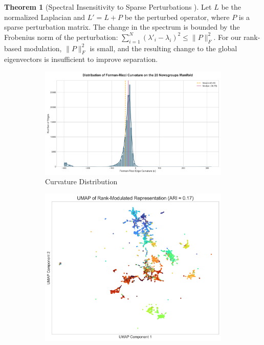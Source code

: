 \documentclass[11pt, letterpaper, twoside]{article}
\theoremstyle{definition}
\newtheorem{theorem}{Theorem}
\begin{document}
\begin{theorem}[Spectral Insensitivity to Sparse Perturbations \cite{hoffman1953variation}]
\label{thm:hoffman}
Let $L$ be the normalized Laplacian and $L' = L+P$ be the perturbed operator, where $P$ is a sparse perturbation matrix. The change in the spectrum is bounded by the Frobenius norm of the perturbation: $\sum_{i=1}^N (\lambda'_i - \lambda_i)^2 \le \|P\|_F^2$. For our rank-based modulation, $\|P\|_F^2$ is small, and the resulting change to the global eigenvectors is insufficient to improve separation.
\end{theorem}

\begin{figure}[h!]
    \centering
    \begin{subfigure}[b]{0.48\textwidth}
        \centering
        \includegraphics[width=\textwidth]{../../paper/figures/curvature_distribution.png}
        \caption{Curvature Distribution}
        \label{fig:curvature_dist}
    \end{subfigure}
    \hfill
    \begin{subfigure}[b]{0.48\textwidth}
        \centering
        \includegraphics[width=\textwidth]{../../paper/figures/failed_heuristic_visualization.png}

\end{subfigure}
\end{figure}
\end{document}
